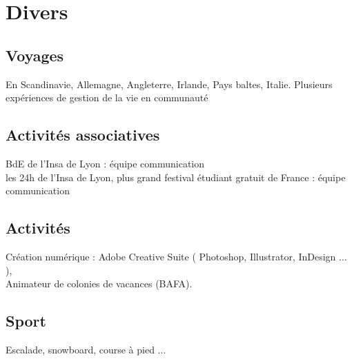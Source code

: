 \section{Divers}
	\subsection{Voyages}
		{En Scandinavie, Allemagne, Angleterre, Irlande, Pays baltes, Italie. Plusieurs expériences de gestion de la vie en communauté}
		
	\subsection{Activités associatives}
		{BdE de l'Insa de Lyon : équipe communication\\
		 les 24h de l'Insa de Lyon, plus grand festival étudiant gratuit de France : équipe communication}
		
	\subsection{Activités}
		{Création numérique : Adobe Creative Suite ( Photoshop, Illustrator, InDesign ... ),\\
		 Animateur de colonies de vacances (BAFA).}
		
	\subsection{Sport}
		{Escalade, snowboard, course à pied ...}
		

